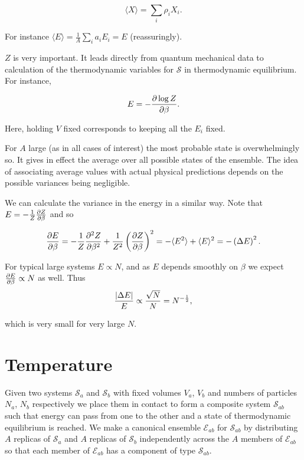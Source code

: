 \documentclass{notes}
\newcommand{\cS}{\mathcal{S}}
\newcommand{\cE}{\mathcal{E}}
\newcommand{\ave}[1]{\langle#1\rangle}
\begin{document}
\begin{equation}\label{eq:ave}
\ave{X} = \sum_i \rho_i X_i.
\end{equation}

For instance $\ave{E} = \frac{1}{A} \sum_i a_i E_i = E$ (reassuringly).

$Z$ is very important.  It leads directly from quantum mechanical data
to calculation of the thermodynamic variables for $\cS$ in
thermodynamic equilibrium.  For instance,

\begin{equation}\label{eq:energy}
E = - \frac{\partial \log Z}{\partial \beta}.
\end{equation}

Here, holding $V$ fixed corresponds to keeping all the $E_i$ fixed.

For $A$ large (as in all cases of interest) the most probable state
is overwhelmingly so.  It gives in effect the average over all possible
states of the ensemble.  The idea of associating average values with
actual physical predictions depends on the possible variances being negligible.

We can calculate the variance in the energy in a similar way.  Note that
$E = - \frac{1}{Z} \frac{\partial Z}{\partial \beta}$ and so

\[
\pd{E}{\beta} = -\frac{1}{Z} \pd{^2 Z}{\beta^2}
+ \frac{1}{Z^2} \left( \pd{Z}{\beta} \right)^2
= - \ave{E^2} + \ave{E}^2 = - \left( \Delta E \right)^2.
\]

For typical large systems $E \propto N$, and as $E$ depends smoothly
on $\beta$ we expect $\frac{\partial E}{\partial \beta} \propto N$ as well.  Thus
\[
\frac{\left|\Delta E\right|}{E} \propto \frac{\sqrt{N}}{N} = N^{-\frac{1}{2}},
\]

which is very small for very large $N$.

\section{Temperature}\label{sec:temp}

Given two systems $\cS_a$ and $\cS_b$ with fixed volumes $V_a$, $V_b$
and numbers of particles $N_a$, $N_b$ respectively we place them
in contact to form a composite system $\cS_{ab}$ such that energy
can pass from one to the other and a state of thermodynamic equilibrium is
reached.  We make a canonical ensemble $\cE_{ab}$ for $\cS_{ab}$
by distributing $A$ replicas of $\cS_a$ and $A$ replicas of $\cS_b$
independently across the $A$ members of $\cE_{ab}$ so that
each member of $\cE_{ab}$ has a component of type $\cS_{ab}$.
\end{document}
